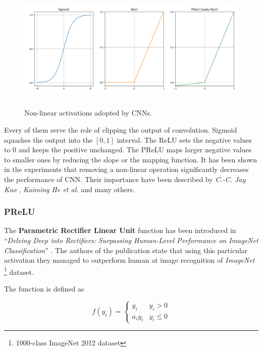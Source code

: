 \begin{figure}[h]
    \centering
    \includegraphics[width=16cm, height=6cm]{img/CNN-activations.png}
    \caption{Non-linear activations adopted by CNNs.}
    \label{fig:conv-activation}
\end{figure}

Every of them serve the role of clipping the output of convolution. Sigmoid squashes the output into the $[0, 1]$ interval. The ReLU sets the negative values to 0 and keeps the positive unchanged. The PReLU maps larger negative values to smaller ones by reducing the slope or the mapping function. It has been shown in the experiments that removing a non-linear operation significantly decreases the performance of CNN. Their importance have been described by \emph{C.-C. Jay Kuo} \cite{kuo2016understanding}, \emph{Kaiming He et al.} \cite{he2015delving} and many others.


\subsubsection*{PReLU}
\label{sub2:prelu}

The \textbf{Parametric Rectifier Linear Unit} function has been introduced in ``\emph{Delving Deep into Rectifiers: Surpassing Human-Level Performance on ImageNet Classification}'' \cite{he2015delving}. The authors of the publication state that using this particular activation they managed to outperform human at image recognition of \emph{ImageNet} \footnote{1000-class ImageNet 2012 dataset} dataset.

The function is defined as

\begin{equation}
    f(y_i) = 
        \begin{cases}
        y_i & y_i > 0 \\
        a_i y_i & y_i \leq 0
        \end{cases}
\end{equation}

